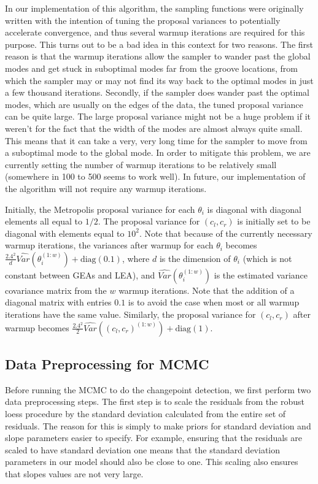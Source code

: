 \documentclass[12pt]{article}
\begin{document}
In our implementation of this algorithm, the sampling functions were
originally written with the intention of tuning the proposal variances
to potentially accelerate convergence, and thus several warmup
iterations are required for this purpose. This turns out to be a bad
idea in this context for two reasons. The first reason is that the
warmup iterations allow the sampler to wander past the global modes and
get stuck in suboptimal modes far from the groove locations, from which
the sampler may or may not find its way back to the optimal modes in
just a few thousand iterations. Secondly, if the sampler does wander
past the optimal modes, which are usually on the edges of the data, the
tuned proposal variance can be quite large. The large proposal variance
might not be a huge problem if it weren't for the fact that the width of
the modes are almost always quite small. This means that it can take a
very, very long time for the sampler to move from a suboptimal mode to
the global mode. In order to mitigate this problem, we are currently
setting the number of warmup iterations to be relatively small
(somewhere in 100 to 500 seems to work well). In future, our
implementation of the algorithm will not require any warmup iterations.

Initially, the Metropolis proposal variance for each \(\theta_i\) is
diagonal with diagonal elements all equal to \(1/2\). The proposal
variance for \((c_l, c_r)\) is initially set to be diagonal with
elements equal to \(10^2\). Note that because of the currently necessary
warmup iterations, the variances after warmup for each \(\theta_i\)
becomes
\(\frac{2.4^2}{d}\hat{Var}(\theta_i^{(1:w)}) + \text{diag}(0.1)\), where
\(d\) is the dimension of \(\theta_i\) (which is not constant between
GEAs and LEA), and \(\hat{Var}(\theta_i^{(1:w)})\) is the estimated
variance covariance matrix from the \(w\) warmup iterations. Note that
the addition of a diagonal matrix with entries \(0.1\) is to avoid the
case when most or all warmup iterations have the same value. Similarly,
the proposal variance for \((c_l, c_r)\) after warmup becomes
\(\frac{2.4^2}{2}\hat{Var}((c_l,c_r)^{(1:w)}) + \text{diag}(1)\).

\subsection{Data Preprocessing for MCMC}

Before running the MCMC to do the changepoint detection, we first
perform two data preprocessing steps. The first step is to scale the
residuals from the robust loess procedure by the standard deviation
calculated from the entire set of residuals. The reason for this is
simply to make priors for standard deviation and slope parameters easier
to specify. For example, ensuring that the residuals are scaled to have
standard deviation one means that the standard deviation parameters in
our model should also be close to one. This scaling also ensures that
slopes values are not very large.
\end{document}
